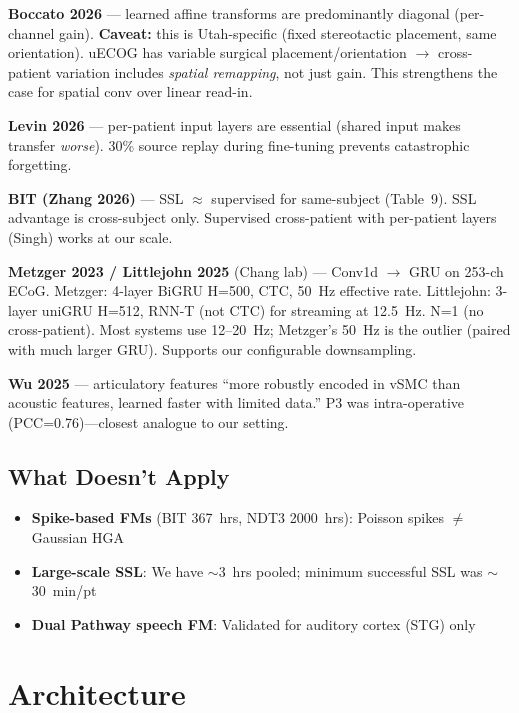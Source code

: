 \documentclass[11pt, letterpaper]{article}
\begin{document}
\textbf{Boccato 2026} --- learned affine transforms are predominantly diagonal (per-channel gain). \textbf{Caveat:} this is Utah-specific (fixed stereotactic placement, same orientation). uECOG has variable surgical placement/orientation $\to$ cross-patient variation includes \emph{spatial remapping}, not just gain. This strengthens the case for spatial conv over linear read-in.

\textbf{Levin 2026} --- per-patient input layers are essential (shared input makes transfer \emph{worse}). 30\% source replay during fine-tuning prevents catastrophic forgetting.

\textbf{BIT (Zhang 2026)} --- SSL $\approx$ supervised for same-subject (Table~9). SSL advantage is cross-subject only. Supervised cross-patient with per-patient layers (Singh) works at our scale.

\textbf{Metzger 2023 / Littlejohn 2025} (Chang lab) --- Conv1d $\to$ GRU on 253-ch ECoG. Metzger: 4-layer BiGRU H=500, CTC, 50~Hz effective rate. Littlejohn: 3-layer uniGRU H=512, RNN-T (not CTC) for streaming at 12.5~Hz. N=1 (no cross-patient). Most systems use 12--20~Hz; Metzger's 50~Hz is the outlier (paired with much larger GRU). Supports our configurable downsampling.

\textbf{Wu 2025} --- articulatory features ``more robustly encoded in vSMC than acoustic features, learned faster with limited data.'' P3 was intra-operative (PCC=0.76)---closest analogue to our setting.

\subsection{What Doesn't Apply}

\begin{itemize}[nosep]
  \item \textbf{Spike-based FMs} (BIT 367~hrs, NDT3 2000~hrs): Poisson spikes $\neq$ Gaussian HGA
  \item \textbf{Large-scale SSL}: We have ${\sim}$3~hrs pooled; minimum successful SSL was ${\sim}$30~min/pt
  \item \textbf{Dual Pathway speech FM}: Validated for auditory cortex (STG) only
\end{itemize}


\section{Architecture}
\label{sec:arch}
\end{document}
